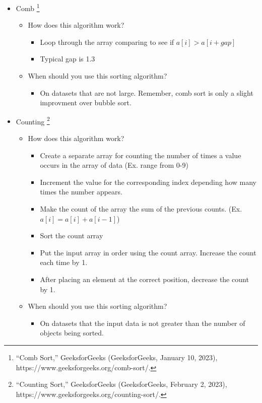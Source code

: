 \documentclass[11pt]{article}
\begin{document}
\begin{itemize}
\item{Comb}
\footnote{“Comb Sort,” GeeksforGeeks (GeeksforGeeks, January 10, 2023), https://www.geeksforgeeks.org/comb-sort/.}
\begin{itemize}
\addtolength{\itemindent}{0.80cm}
\itemsep0em 
\item{How does this algorithm work?}
\begin{itemize}
\addtolength{\itemindent}{0.80cm}
\itemsep0em 
\item{Loop through the array comparing to see if $a[i] > a[i + gap] $}
\item{Typical gap is 1.3}
\end{itemize}
\item{When should you use this sorting algorithm?}
\begin{itemize}
\addtolength{\itemindent}{0.80cm}
\itemsep0em 
\item{On datasets that are not large. Remember, comb sort is only a slight improvment over bubble sort.}
\end{itemize}
\end{itemize}

\item{Counting}
\footnote{“Counting Sort,” GeeksforGeeks (GeeksforGeeks, February 2, 2023), https://www.geeksforgeeks.org/counting-sort/.}
\begin{itemize}
\addtolength{\itemindent}{0.80cm}
\itemsep0em 
\item{How does this algorithm work?}
\begin{itemize}
\addtolength{\itemindent}{0.80cm}
\itemsep0em 
\item{Create a separate array for counting the number of times a value occurs in the array of data (Ex. range from 0-9)}
\item{Increment the value for the corresponding index depending how many times the number appears.}
\item{Make the count of the array the sum of the previous counts. (Ex. $ a[i] = a[i] + a[i-1]$)}
\item{Sort the count array}
\item{Put the input array in order using the count array. Increase the count each time by 1.}
\item{After placing an element at the correct position, decrease the count by 1.}
\end{itemize}
\item{When should you use this sorting algorithm?}
\begin{itemize}
\addtolength{\itemindent}{0.80cm}
\itemsep0em 
\item{On datasets that the input data is not greater than the number of objects being sorted. }
\end{itemize}
\end{itemize}


\end{itemize}
\end{document}
